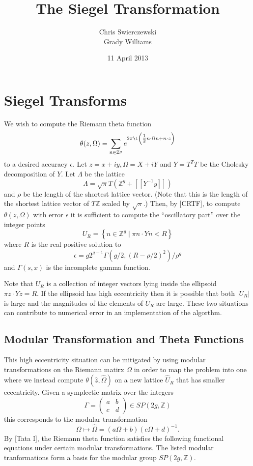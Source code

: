 \documentclass{amsart}
\title{The Siegel Transformation}
\author{
  Chris Swierczewski \\
  Grady Williams
}
\date{11 April 2013}
\begin{document}
\maketitle

\section{Siegel Transforms}



We wish to compute the Riemann theta function
\[
  \theta(z,\Omega) = \sum_{n \in \mathbb{Z}^g}
  e^{2\pi\i \left( \tfrac{1}{2} n \cdot \Omega n + n \cdot z \right)}
\]
to a desired accuracy $\epsilon$. Let $z = x+iy,\Omega = X + iY$ and $Y = T^TT$
be the Cholesky decomposition of $Y$. Let $\Lambda$ be the lattice
\[
  \Lambda = \sqrt{\pi}T \left( \mathbb{Z}^g + [[Y^{-1}y]] \right)
\]
and $\rho$ be the length of the shortest lattice vector. (Note that
this is the length of the shortest lattice vector of $T\mathbb{Z}$
scaled by $\sqrt{\pi}$.) Then, by [CRTF], to compute
$\theta(z,\Omega)$ with error $\epsilon$ it is sufficient to compute
the ``oscillatory part'' over the integer points
\[
  U_R = \left\{ n \in \mathbb{Z}^g \; | \; \pi n \cdot Y n < R \right\}
\]
where $R$ is the real positive solution to
\[
  \epsilon = g2^{g-1}\Gamma(g/2,(R-\rho/2)^2)/\rho^g
\]
and $\Gamma(s,x)$ is the incomplete gamma function.

Note that $U_R$ is a collection of integer vectors lying inside the
ellipsoid $\pi z \cdot Yz = R$. If the ellipsoid has high eccentricity
then it is possible that both $|U_R|$ is large and the magnitudes of
the elements of $U_R$ are large. These two situations can contribute
to numerical error in an implementation of the algorthm.



\subsection{Modular Transformation and Theta Functions}



This high eccentricity situation can be mitigated by using modular
transformations on the Riemann matirx $\Omega$ in order to map the
problem into one where we instead compute $\theta(\hat{z},
\hat{\Omega})$ on a new lattice $\hat{U}_R$ that has smaller
eccentricity. Given a symplectic matrix over the integers
\[
\Gamma = \left( \begin{matrix} a & b \\ c & d \end{matrix} \right)
\in SP(2g,\mathbb{Z})
\]
this corresponds to the modular transformation
\[
\Omega \mapsto \hat{\Omega} = (a\Omega + b) (c\Omega + d)^{-1}.
\]
By [Tata I], the Riemann theta function satisfies the following
functional equations under certain modular transformations. The listed
modular tranformations form a basis for the modular group $SP(2g,
\mathbb{Z})$.
\end{document}
